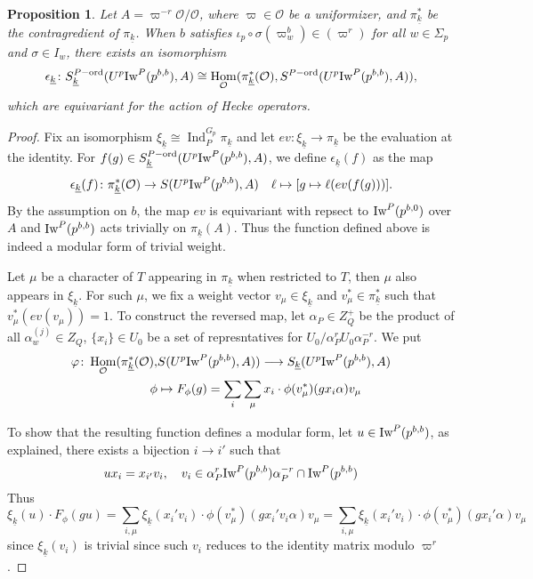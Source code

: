 \documentclass[leqno]{amsart}
\newcommand{\wt}[1]{\underline{ #1 }}
\newcommand{\Iw}{\textnormal{Iw}}
\newcommand{\ord}{\textnormal{ord}}
\newcommand{\oo}{\mathcal{O}} %
\DeclareMathOperator{\Hom}{Hom}
\DeclareMathOperator{\Ind}{Ind}
\newtheorem{prop}[thm]{Proposition}
\theoremstyle{definition}
\theoremstyle{remark}
\begin{document}
\begin{prop}
	Let $A=\varpi^{-r}\oo/\oo$,
	where $\varpi\in\oo$ be a uniformizer,
	and $\pi_{\wt{k}}^*$ be the contragredient of 
	$\pi_{\wt{k}}$.
	When $b$ satisfies
	$\iota_p\circ\sigma(\varpi_w^b)\in (\varpi^r)$
	for all  $w\in \Sigma_p$ and $\sigma\in I_w$,
	there exists an isomorphism
	\[
		\epsilon_{\wt{k}}
		\colon S_{\wt{k}}^{P-\ord}(U^p\Iw^P(p^{b,b}),A)\cong 
		\Hom_{\oo}(\pi_{\wt{k}}^*(\oo),
		S^{P-\ord}(U^p\Iw^P(p^{b,b}),A)),
	\]
	which are equivariant for the action of Hecke operators.
\end{prop}
\begin{proof}
	Fix an isomorphism $\xi_{\wt{k}}\cong \Ind_{P}^{G_p}\pi_{\wt{k}}$
	and let $ev\colon \xi_{\wt{k}}\to \pi_{\wt{k}}$
	be the evaluation at the identity.
	For $f(g)\in S_{\wt{k}}^{P-\ord}(U^p\Iw^P(p^{b,b}),A)$, we define 
	$\epsilon_{\wt{k}}(f)$ as the map
	\[
	\epsilon_{\wt{k}}(f)\colon \pi^*_{\wt{k}}(\oo)\rightarrow
	S(U^p\Iw^P(p^{b,b}),A)\quad
	\ell\mapsto [g\mapsto \ell(ev(f(g)))].
	\]
	By the assumption on $b$,
	the map $ev$ is equivariant with repsect to  $\Iw^P(p^{b,0})$ 
	over $A$
	and $\Iw^P(p^{b,b})$ acts trivially on $\pi_{\wt{k}}(A)$.
	Thus the function defined above is indeed a modular form
	of trivial weight.


	Let $\mu$ be a character of $T$ appearing 
	in $\pi_{\wt{k}}$ when restricted to $T$, then $\mu$
	also appears in  $\xi_{\wt{k}}$.
	For such $\mu$, we fix a weight vector $v_\mu\in \xi_{\wt{k}}$
	and $v^*_\mu\in \pi_{\wt{k}}^*$
	such that $v^*_{\mu}(ev(v_\mu))=1$.
	To construct the reversed map,
	let $\alpha_P\in Z_Q^+$ be the product
	of all $\alpha_w^{(j)}\in Z_Q$, $\{x_i\}\in U_0$
	be a set of represntatives for $U_0/\alpha_P^r U_0\alpha^{-r}_P$.
	We put 
	\begin{align*}
		\varphi\colon 
		\Hom_{\oo}(\pi_{\wt{k}}^*(\oo),&
		S(U^p\Iw^P(p^{b,b}),A))\longrightarrow
		S_{\wt{k}}(U^p\Iw^P(p^{b,b}),A)\\
		\phi&\mapsto 
		F_\phi(g)=\sum_i \sum_{\mu}
		x_i\cdot \phi(v^*_\mu)(gx_i\alpha)v_\mu
	\end{align*}

	To show that the resulting function defines a modular form,
	let $u\in \Iw^P(p^{b,b})$, as explained, 
	there exists a bijection $i\to i'$ such that 
	 \[
		ux_i=x_{i'}v_i,\quad
		v_i\in\alpha_P^r\Iw^P(p^{b,b})\alpha_P^{-r} \cap \Iw^P(p^{b,b})
	\]
	Thus
	\[
		\xi_{\wt{k}}(u)\cdot F_\phi(gu)=
		\sum_{i,\mu}
		\xi_{\wt{k}}(x_i'v_i)\cdot 
		\phi(v^*_\mu)(gx_i'v_i\alpha)v_\mu=
		\sum_{i,\mu}
		\xi_{\wt{k}}(x_i'v_i)\cdot 
		\phi(v^*_\mu)(gx_i'\alpha)v_\mu
	\]
	since $\xi_{\wt{k}}(v_i)$ is trivial since such $v_i$ reduces to 
	the identity matrix modulo  $\varpi^r$.


\end{proof}
\end{document}
